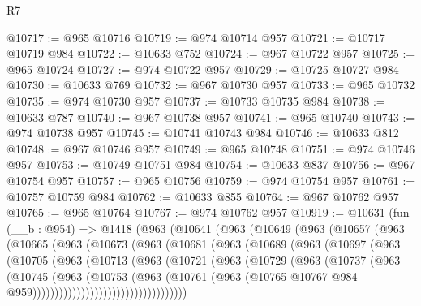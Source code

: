 \begin{lexlean}{R7}
\begin{coremodule}
@10717 := @965 @10716
@10719 := @974 @10714 @957
@10721 := @10717 @10719 @984
@10722 := @10633 @752
@10724 := @967 @10722 @957
@10725 := @965 @10724
@10727 := @974 @10722 @957
@10729 := @10725 @10727 @984
@10730 := @10633 @769
@10732 := @967 @10730 @957
@10733 := @965 @10732
@10735 := @974 @10730 @957
@10737 := @10733 @10735 @984
@10738 := @10633 @787
@10740 := @967 @10738 @957
@10741 := @965 @10740
@10743 := @974 @10738 @957
@10745 := @10741 @10743 @984
@10746 := @10633 @812
@10748 := @967 @10746 @957
@10749 := @965 @10748
@10751 := @974 @10746 @957
@10753 := @10749 @10751 @984
@10754 := @10633 @837
@10756 := @967 @10754 @957
@10757 := @965 @10756
@10759 := @974 @10754 @957
@10761 := @10757 @10759 @984
@10762 := @10633 @855
@10764 := @967 @10762 @957
@10765 := @965 @10764
@10767 := @974 @10762 @957
@10919 := @10631
    (fun (__b : @954) =>
    @1418
      (@963
        (@10641
          (@963
            (@10649
              (@963
                (@10657
                  (@963
                    (@10665
                      (@963
                        (@10673
                          (@963
                            (@10681
                              (@963
                                (@10689
                                  (@963
                                    (@10697
                                      (@963
                                        (@10705
                                          (@963
                                            (@10713
                                              (@963
                                                (@10721
                                                  (@963
                                                    (@10729
                                                      (@963
                                                        (@10737
                                                          (@963
                                                            (@10745
                                                              (@963
                                                                (@10753
                                                                  (@963
                                                                    (@10761
                                                                      (@963
                                                                        (@10765
                                                                          @10767
                                                                          @984
                                                                          @959)))))))))))))))))))))))))))))))))))

\end{coremodule}
\end{lexlean}

